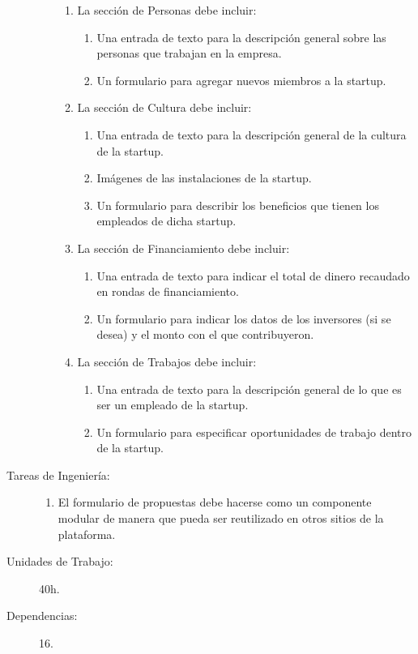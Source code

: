 \begin{description}
\begin{enumerate}
\begin{enumerate}
        				
        			\item La sección de Personas debe incluir:
        				\begin{enumerate}
        				    \item Una entrada de texto para la descripción general sobre las personas que trabajan en la empresa.
        				    \item Un formulario para agregar nuevos miembros a la startup.
        				\end{enumerate}
        			\item La sección de Cultura debe incluir:
        			    \begin{enumerate}
        			        \item Una entrada de texto para la descripción general de la cultura de la startup.
            				\item Imágenes de las instalaciones de la startup.
            				\item Un formulario para describir los beneficios que tienen los empleados de dicha startup.
        			    \end{enumerate}
        				
        			\item La sección de Financiamiento debe incluir:
        			   \begin{enumerate}
        			       \item Una entrada de texto para indicar el total de dinero recaudado en rondas de financiamiento.
        			       \item Un formulario para indicar los datos de los inversores (si se desea) y el monto con el que contribuyeron.
        			   \end{enumerate}
        			\item La sección de Trabajos debe incluir:	    \begin{enumerate}
        			        \item Una entrada de texto para la descripción general de lo que es ser un empleado de la startup.
        				    \item Un formulario para especificar oportunidades de trabajo dentro de la startup.
        			\end{enumerate} 
			    \end{enumerate}
        \end{enumerate}
    \item[Tareas de Ingeniería:]  \hfill
        \begin{enumerate}
            \item El formulario de propuestas debe hacerse como un componente modular de manera que pueda ser reutilizado en otros sitios de la plataforma.
        \end{enumerate}
    \item[Unidades de Trabajo:] 40h.
    \item[Dependencias:] 16.
\end{description}


